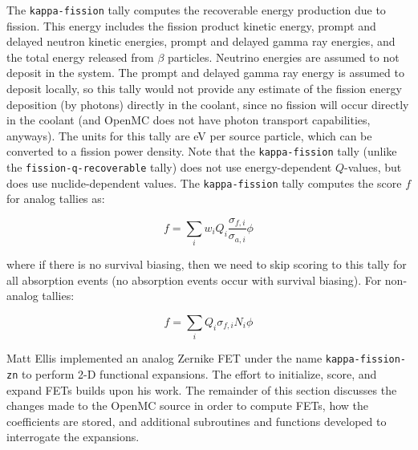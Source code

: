 \documentclass[10pt]{article}
\newcommand{\beq}{\begin{equation}}
\newcommand{\eeq}{\end{equation}}
\numberwithin{equation}{section} %
\begin{document}
The {\tt kappa-fission} tally computes the recoverable energy production due to fission. This energy includes the fission product kinetic energy, prompt and delayed neutron kinetic energies, prompt and delayed gamma ray energies, and the total energy released from \(\beta\) particles. Neutrino energies are assumed to not deposit in the system. The prompt and delayed gamma ray energy is assumed to deposit locally, so this tally would not provide any estimate of the fission energy deposition (by photons) directly in the coolant, since no fission will occur directly in the coolant (and OpenMC does not have photon transport capabilities, anyways). The units for this tally are eV per source particle, which can be converted to a fission power density. Note that the {\tt kappa-fission} tally (unlike the {\tt fission-q-recoverable} tally) does not use energy-dependent \(Q\)-values, but does use nuclide-dependent values. The {\tt kappa-fission} tally computes the score \(f\) for analog tallies as:

\beq
f=\sum_{i}w_iQ_i\frac{\sigma_{f,i}}{\sigma_{a,i}}\phi
\eeq

where if there is no survival biasing, then we need to skip scoring to this tally for all absorption events (no absorption events occur with survival biasing). For non-analog tallies:

\beq
f=\sum_{i}Q_i\sigma_{f,i}N_i\phi
\eeq

Matt Ellis implemented an analog Zernike FET under the name {\tt kappa-fission-zn} to perform 2-D functional expansions. The effort to initialize, score, and expand FETs builds upon his work. The remainder of this section discusses the changes made to the OpenMC source in order to compute FETs, how the coefficients are stored, and additional subroutines and functions developed to interrogate the expansions.


\end{document}
